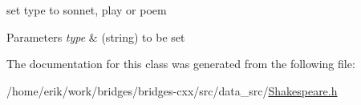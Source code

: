set type to sonnet, play or poem 
\begin{DoxyParams}{Parameters}
{\em type} & (string) to be set \\
\hline
\end{DoxyParams}


The documentation for this class was generated from the following file\+:\begin{DoxyCompactItemize}
\item 
/home/erik/work/bridges/bridges-\/cxx/src/data\+\_\+src/\hyperlink{_shakespeare_8h}{Shakespeare.\+h}\end{DoxyCompactItemize}
